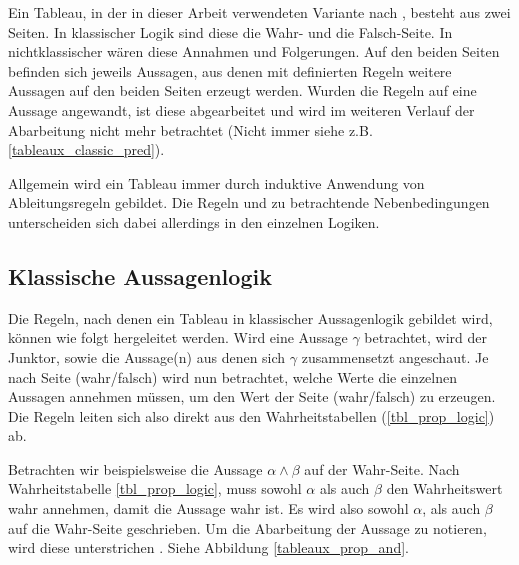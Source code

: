 Ein Tableau, in der in dieser Arbeit verwendeten Variante nach \cite{BK82}, besteht aus zwei Seiten. In klassischer Logik sind diese die Wahr- und die Falsch-Seite. In nichtklassischer wären diese Annahmen und Folgerungen. Auf den beiden Seiten befinden sich jeweils Aussagen, aus denen mit definierten Regeln weitere Aussagen auf den beiden Seiten erzeugt werden. Wurden die Regeln auf eine Aussage angewandt, ist diese abgearbeitet und wird im weiteren Verlauf der Abarbeitung nicht mehr betrachtet (Nicht immer siehe z.B. \ref{tableaux_classic_pred}).

Allgemein wird ein Tableau immer durch induktive Anwendung von Ableitungsregeln gebildet. Die Regeln und zu betrachtende Nebenbedingungen unterscheiden sich dabei allerdings in den einzelnen Logiken.

\subsection{Klassische Aussagenlogik}
Die Regeln, nach denen ein Tableau in klassischer Aussagenlogik gebildet wird, können wie folgt hergeleitet werden. Wird eine Aussage $\gamma$ betrachtet, wird der Junktor, sowie die Aussage(n) aus denen sich $\gamma$ zusammensetzt angeschaut. Je nach Seite (wahr/falsch) wird nun betrachtet, welche Werte die einzelnen Aussagen annehmen müssen, um den Wert der Seite (wahr/falsch) zu erzeugen. Die Regeln leiten sich also direkt aus den Wahrheitstabellen (\ref{tbl_prop_logic}) ab.

Betrachten wir beispielsweise die Aussage $\alpha\wedge\beta$ auf der Wahr-Seite. Nach Wahrheitstabelle \ref{tbl_prop_logic}, muss sowohl $\alpha$ als auch $\beta$ den Wahrheitswert wahr annehmen, damit die Aussage wahr ist. Es wird also sowohl $\alpha$, als auch $\beta$ auf die Wahr-Seite geschrieben. Um die Abarbeitung der Aussage zu notieren, wird diese unterstrichen \cite{KB14}. Siehe Abbildung \ref{tableaux_prop_and}.

